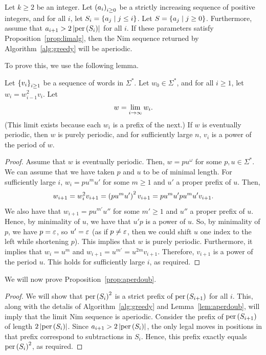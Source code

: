\documentclass[english,12pt]{article}
\newcommand{\seq}{\p}
\DeclareMathOperator{\per}{per}
\begin{document}
\begin{prop}\label{prop:aperdoub}
Let $k\geq2$ be an integer.  Let $\seq{a_i}_{i\geq0}$ be a strictly increasing sequence of positive integers, and for all $i$, let $S_i=\left\{a_j\mid j\leq i\right\}$.  Let $S=\left\{a_j\mid j\geq0\right\}$.  Furthermore, assume that $a_{i+1}>2\ab{\per\p{S_i}}$ for all $i$.  If these parameters satisfy Proposition~\ref{prop:limalg}, then the Nim sequence returned by Algorithm~\ref{alg:greedy} will be aperiodic.
\end{prop}
To prove this, we use the following lemma.
\begin{lemma}\label{lem:aperdoub}
Let $\left\{v_i\right\}_{i\geq1}$ be a sequence of words in $\Sigma^*$.  Let $w_0\in\Sigma^*$, and for all $i\geq1$, let $w_i=w_{i-1}^2v_i$.  Let
\[
w=\lim_{i\rightarrow\infty}{w_i}.
\]
(This limit exists because each $w_i$ is a prefix of the next.)  If $w$ is eventually periodic, then $w$ is purely periodic, and for sufficiently large $n$, $v_i$ is a power of the period of $w$.
\end{lemma}
\begin{proof}
Assume that $w$ is eventually periodic.  Then, $w=pu^\omega$ for some $p,u\in\Sigma^*$.  We can assume that we have taken $p$ and $u$ to be of minimal length.  For sufficiently large $i$, $w_i=pu^mu'$ for some $m\geq1$ and $u'$ a proper prefix of $u$.  Then,
\[
w_{i+1}=w_i^2v_{i+1}=\left(pu^mu'\right)^2v_{i+1}=pu^mu'pu^mu'v_{i+1}.
\]
We also have that $w_{i+1}=pu^{m'}u''$ for some $m'\geq1$ and $u''$ a proper prefix of $u$.  Hence, by minimality of $u$, we have that $u'p$ is a power of $u$.  So, by minimality of $p$, we have $p=\varepsilon$, so $u'=\varepsilon$ (as if $p\neq\varepsilon$, then we could shift $u$ one index to the left while shortening $p$).  This implies that $w$ is purely periodic.  Furthermore, it implies that $w_i=u^m$ and $w_{i+1}=u^{m'}=u^{2m}v_{i+1}$.  Therefore, $v_{i+1}$ is a power of the period $u$. This holds for sufficiently large $i$, as required.
\end{proof}
We will now prove Proposition~\ref{prop:aperdoub}.
\begin{proof}
We will show that $\per\p{S_i}^2$ is a strict prefix of $\per\p{S_{i+1}}$ for all $i$.   This, along with the detalis of Algorithm~\ref{alg:greedy} and Lemma~\ref{lem:aperdoub}, will imply that the limit Nim sequence is aperiodic.  Consider the prefix of $\per\p{S_{i+1}}$ of length $2\ab{\per\p{S_i}}$.  Since $a_{i+1}>2\ab{\per\p{S_i}}$, the only legal moves in positions in that prefix correspond to subtractions in $S_i$.  Hence, this prefix exactly equals $\per\p{S_i}^2$, as required.
\end{proof}
\end{document}
